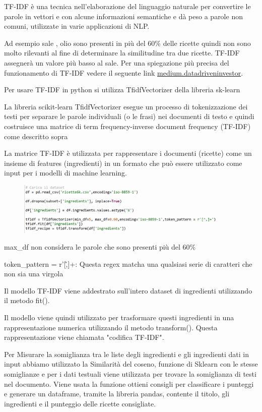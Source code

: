 \documentclass[12pt]{report}
\begin{document}
TF-IDF è una tecnica nell'elaborazione del linguaggio naturale per convertire le parole in vettori e con alcune informazioni semantiche e dà peso a parole non comuni, utilizzate in varie applicazioni di NLP. 

Ad esempio sale , olio sono presenti in più del 60\% delle ricette quindi non sono molto rilevanti al fine di determinare la similitudine tra due ricette. TF-IDF assegnerà un valore più basso al sale.
Per una spiegazione più precisa del funzionamento di TF-IDF vedere il seguente link \href{https://medium.datadriveninvestor.com/tf-idf-in-natural-language-processing-8db8ef4a7736}{medium.datadriveninvestor}.

Per usare TF-IDF in python si utilizza TfidfVectorizer della libreria sk-learn 

La libreria scikit-learn TfidfVectorizer esegue un processo di tokenizzazione dei testi per separare le parole individuali (o le frasi) nei documenti di testo e quindi costruisce una matrice di term frequency-inverse document frequency (TF-IDF) come descritto sopra

La matrice TF-IDF è utilizzata per rappresentare i documenti (ricette) come un insieme di features (ingredienti) in un formato che può essere utilizzato come input per i modelli di machine learning.

\begin{figure}[H]
        \centering
        {\includegraphics[width=0.9\textwidth]{img/img12.jpg}}
\end{figure}

max\_df non considera le parole che sono presenti più del 60\% 

token\_pattern = r'[\^,]+: Questa regex matcha una qualsiasi serie di caratteri che non sia una virgola

Il modello TF-IDF viene addestrato sull'intero dataset di ingredienti utilizzando il metodo fit().

Il modello viene quindi utilizzato per trasformare questi ingredienti in una rappresentazione numerica utilizzando il metodo transform(). Questa rappresentazione viene chiamata "codifica TF-IDF".

Per Misurare la somiglianza tra le liste degli ingredienti e gli ingredienti dati in input abbiamo utilizzato la Similarità del coseno, funzione di Sklearn con le stesse somiglianze e per i dati testuali viene utilizzata per trovare la somiglianza di testi nel documento. 
Viene usata la funzione ottieni consigli per classificare i punteggi e generare un dataframe, tramite la libreria pandas, contente il titolo, gli ingredienti e il punteggio delle ricette consigliate.
\end{document}
